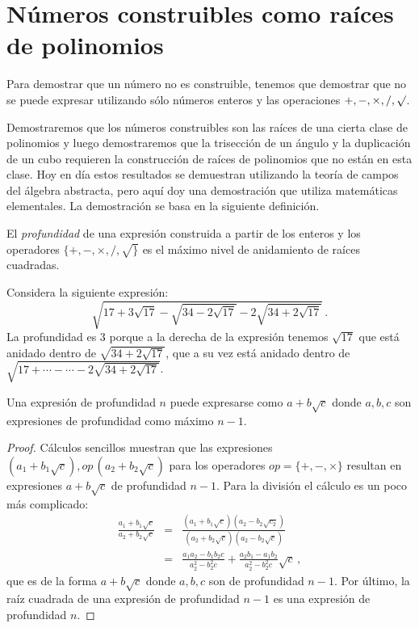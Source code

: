 
\section{Números construibles como raíces de polinomios}\label{s.trisect-poly}

Para demostrar que un número no es construible, tenemos que demostrar que no se puede expresar utilizando sólo números enteros y las operaciones $ {+,-,\times,/,\surd}$.

Demostraremos que los números construibles son las raíces de una cierta clase de polinomios y luego demostraremos que la trisección de un ángulo y la duplicación de un cubo requieren la construcción de raíces de polinomios que no están en esta clase. Hoy en día estos resultados se demuestran utilizando la teoría de campos del álgebra abstracta, pero aquí doy una demostración que utiliza matemáticas elementales. La demostración se basa en la siguiente definición.

\begin{definition}
El \emph{profundidad} de una expresión construida a partir de los enteros y los operadores $\{+,-,\times,/,\surd\}$ es el máximo nivel de anidamiento de raíces cuadradas.
\end{definition}

\begin{example}
Considera la siguiente expresión:
\[
\sqrt{17+3\sqrt{17} - \sqrt{34-2\sqrt{17}}
  -2\sqrt{34+2\sqrt{17}} }\,.
\]
La profundidad es $3$ porque a la derecha de la expresión tenemos $\sqrt{17}$ que está anidado dentro de $\sqrt{34+2\sqrt{17}}$, que a su vez está anidado dentro de $\sqrt{17+\cdots-\cdots-2\sqrt{34+2\sqrt{17}}}$.
\end{example}

\begin{theorem}
Una expresión de profundidad $n$ puede expresarse como $a+b\sqrt{c}$ donde $a,b,c$ son expresiones de profundidad como máximo $n-1$.
\end{theorem}
\begin{proof}
Cálculos sencillos muestran que las expresiones $(a_1+b_1\sqrt{c}),\mathit{op}\,(a_2+b_2\sqrt{c})$ para los operadores $\mathit{op}=\{+,-,\times\}$ resultan en expresiones $a+b\sqrt{c}$ de profundidad $n-1$. Para la división el cálculo es un poco más complicado:
\begin{eqnarray*}
\frac{a_1+b_1\sqrt{c}}{a_2+b_2\sqrt{c}}&=&
\frac{(a_1+b_1\sqrt{c})(a_2-b_2\sqrt{c_2})}{(a_2+b_2\sqrt{c})(a_2-b_2\sqrt{c})}\\
&=&\frac{a_1a_2-b_1b_2c}{a_2^2-b_2^2c}+\frac{a_2b_1-a_1b_2}{a_2^2-b_2^2c}\sqrt{c}\,,
\end{eqnarray*}
que es de la forma $a+b\sqrt{c}$ donde $a,b,c$ son de profundidad $n-1$.
Por último, la raíz cuadrada de una expresión de profundidad $n-1$ es una expresión de profundidad $n$.
\end{proof}


